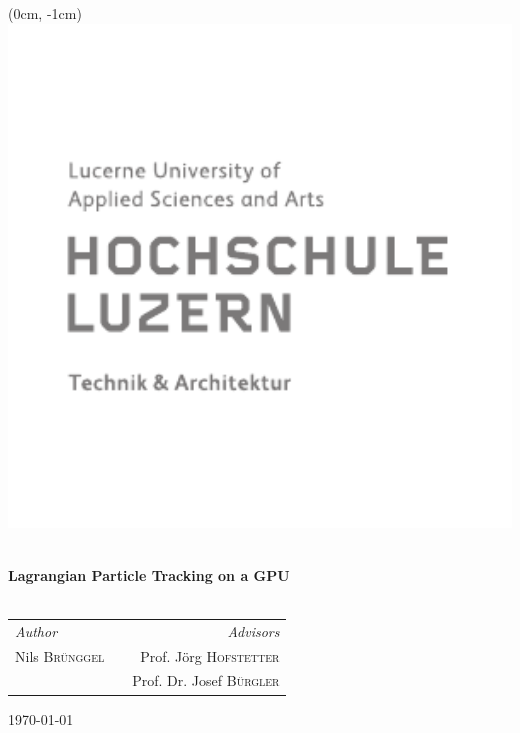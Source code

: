 
\begin{titlepage}

\begin{textblock*}{8cm}(0cm, -1cm)
    \includegraphics[width=1\textwidth]{content/gfx/hslu_logo}
\end{textblock*}

\vspace*{4cm}

\begin{center}
    
    \HRule \\[0.4cm]
    { \huge \bfseries Lagrangian Particle Tracking on a GPU}\\[0.4cm]
    \HRule \\[1cm]

    \begin{tabular}{ l c r }
        \emph{Author}            & \hspace*{6cm} & \emph{Advisors} \\
        Nils \textsc{Br\"unggel} & \hspace*{6cm} & Prof. J\"org \textsc{Hofstetter} \\
        & & Prof. Dr. Josef \textsc{B\"urgler}
    \end{tabular}
    \vfill

    {\large \today}

\end{center}

\newpage

\end{titlepage}
